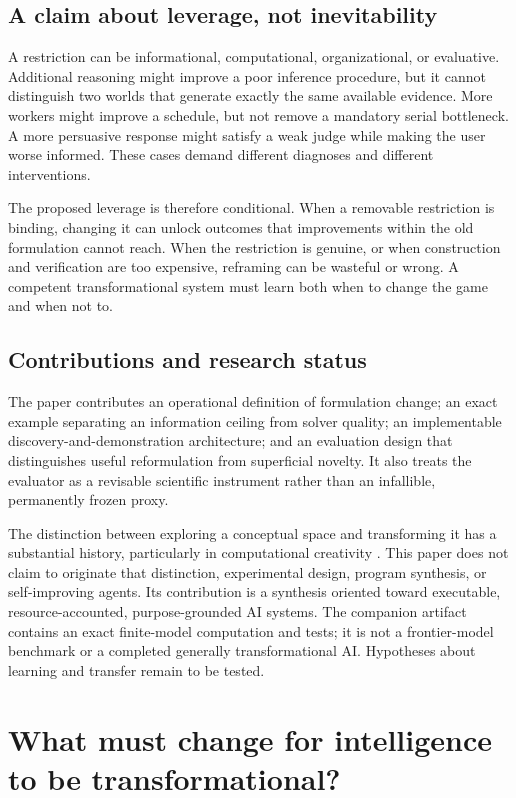 \documentclass[11pt,letterpaper]{article}
\theoremstyle{remark}\newtheorem{remark}{Remark}[section]
\begin{document}
\subsection{A claim about leverage, not inevitability}
A restriction can be informational, computational, organizational, or evaluative. Additional reasoning might improve a poor inference procedure, but it cannot distinguish two worlds that generate exactly the same available evidence. More workers might improve a schedule, but not remove a mandatory serial bottleneck. A more persuasive response might satisfy a weak judge while making the user worse informed. These cases demand different diagnoses and different interventions.

The proposed leverage is therefore conditional. When a removable restriction is binding, changing it can unlock outcomes that improvements within the old formulation cannot reach. When the restriction is genuine, or when construction and verification are too expensive, reframing can be wasteful or wrong. A competent transformational system must learn both when to change the game and when not to.

\subsection{Contributions and research status}
The paper contributes an operational definition of formulation change; an exact example separating an information ceiling from solver quality; an implementable discovery-and-demonstration architecture; and an evaluation design that distinguishes useful reformulation from superficial novelty. It also treats the evaluator as a revisable scientific instrument rather than an infallible, permanently frozen proxy.

The distinction between exploring a conceptual space and transforming it has a substantial history, particularly in computational creativity \citep{boden1998creativity}. This paper does not claim to originate that distinction, experimental design, program synthesis, or self-improving agents. Its contribution is a synthesis oriented toward executable, resource-accounted, purpose-grounded AI systems. The companion artifact contains an exact finite-model computation and tests; it is not a frontier-model benchmark or a completed generally transformational AI. Hypotheses about learning and transfer remain to be tested.

\section{What must change for intelligence to be transformational?}
\label{sec:definition}
\end{document}
